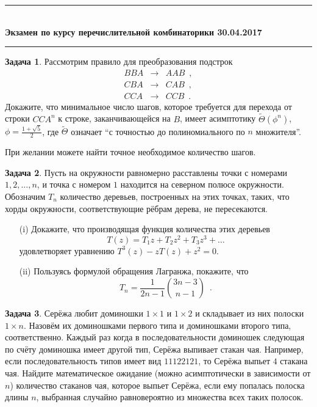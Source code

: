 \documentclass[a5paper]{article}
\def \topic {Экзамен по курсу перечислительной комбинаторики 30.04.2017}
\theoremstyle{definition}
\newtheorem{problem}{Задача}
\newcommand{\HRule}{\rule{\linewidth}{0.5mm}}
\begin{document}
\begin{center}

\vspace{-2cm}
\HRule \\[0.2cm]
{ \Large \bfseries \topic } %
\HRule

\end{center}
\begin{problem}
    Рассмотрим правило для преобразования подстрок
\begin{eqnarray*}
    BBA &\to& AAB \enspace , \\
    CBA &\to& CAB \enspace , \\
    CCA &\to& CCB \enspace . 
\end{eqnarray*}
Докажите, что минимальное число шагов, которое требуется для перехода от строки
\( CC A^{n} \) к строке, заканчивающейся на \( B \), имеет
асимптотику \( \widetilde\Theta(\phi^n) \), \( \phi = \frac{1 + \sqrt{5}}{2} \),
где \( \widetilde \Theta \) означает ``с точностью до полиномиального по \( n \)
множителя''.

При желании можете найти точное необходимое количество шагов.
\end{problem}

\begin{problem}
Пусть на окружности равномерно расставлены точки с номерами
\( 1, 2, \ldots, n \), и точка с номером \( 1 \) находится на северном полюсе
окружности.
Обозначим \( T_n \) количество деревьев, построенных на этих точках, таких, что
хорды окружности, соответствующие рёбрам дерева, не пересекаются.
\begin{enumerate}
\item[(i)] Докажите, что производящая функция количества этих деревьев
\begin{equation}
    T(z) = T_1 z + T_2 z^2 + T_3z^3 + \ldots
\end{equation}
удовлетворяет уравнению
\(
    T^3(z) - z T(z) + z^2 = 0
\).
\item[(ii)] Пользуясь формулой обращения Лагранжа, покажите, что
\begin{equation}
    T_n = \dfrac{1}{2n - 1} {3n - 3 \choose n-1}
    \enspace .
\end{equation}
\end{enumerate}
\end{problem}

\begin{problem}
    Серёжа любит доминошки \( 1 \times 1 \) и \( 1 \times 2 \) и складывает
из них полоски \( 1 \times n \). Назовём их доминошками первого типа и
доминошками второго типа, соответственно.
 Каждый раз когда в последовательности доминошек
следующая по счёту доминошка имеет другой тип, Серёжа выпивает стакан чая.
Например, если последовательность типов имеет вид \( 11122121 \), то Серёжа
выпьет \( 4 \) стакана чая.
Найдите математическое ожидание (можно асимптотически в зависимости от \( n \))
количество стаканов чая, которое выпьет Серёжа, если ему попалась полоска длины
\( n \), выбранная случайно равновероятно из множества всех таких полосок. 
\end{problem}
\end{document}
